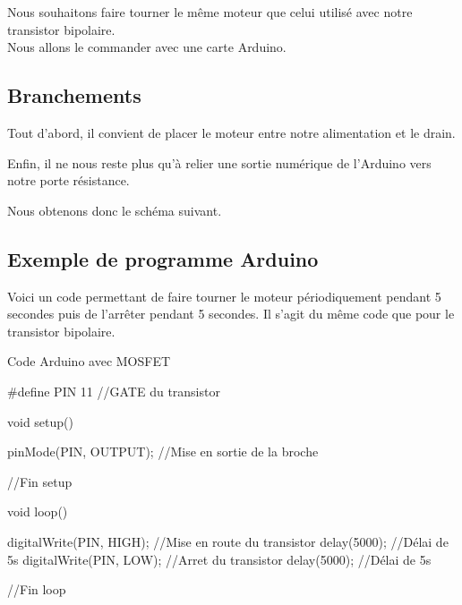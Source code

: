      Nous souhaitons faire tourner le même moteur que celui utilisé avec notre transistor bipolaire.\\
     Nous allons le commander avec une carte Arduino.

     \subsection{Branchements}

     Tout d'abord, il convient de placer le moteur entre notre alimentation et le drain.\\
     
 
 
     Enfin, il ne nous reste plus qu'à relier une sortie numérique de l'Arduino vers notre porte  résistance.
 
     Nous obtenons donc le schéma suivant.
 
  
     \subsection{Exemple de programme Arduino}
 
     Voici un code permettant de faire tourner le moteur périodiquement pendant 5 secondes puis de l'arrêter pendant 5 secondes. Il s'agit du même code que pour le transistor bipolaire.
 
 \begin{Cpp}{Code Arduino avec MOSFET}

  #define PIN 11     //GATE du transistor
 
  void setup() {
  
    pinMode(PIN, OUTPUT); //Mise en sortie de la broche
  
  }//Fin setup
  
  void loop() {
  
    digitalWrite(PIN, HIGH);    //Mise en route du transistor
    delay(5000);               //Délai de 5s
    digitalWrite(PIN, LOW);     //Arret du transistor
    delay(5000);               //Délai de 5s
  
  }//Fin loop
  
 \end{Cpp}
